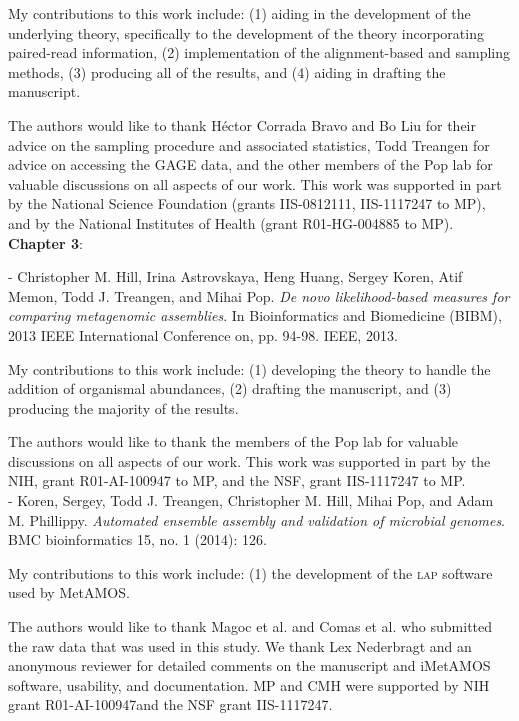 \documentclass[12pt,\mydriver]{thesis}
\begin{document}
My contributions to this work include: (1) aiding in the development of the underlying theory, specifically to the development of the theory incorporating paired-read information, (2) implementation of the alignment-based and sampling methods, (3) producing all of the results, and (4) aiding in drafting the manuscript.

The authors would like to thank H\'{e}ctor Corrada Bravo and Bo Liu for their advice on the sampling procedure and associated statistics, Todd Treangen for advice on accessing the GAGE data, and the other members of the Pop lab for valuable discussions on all aspects of our work. This work was supported in part by the National Science Foundation
(grants IIS-0812111, IIS-1117247 to MP), and by the National
Institutes of Health (grant R01-HG-004885 to MP).\\

\noindent\textbf{Chapter 3}:

\noindent - Christopher M. Hill, Irina Astrovskaya, Heng Huang, Sergey Koren, Atif Memon, Todd J. Treangen, and Mihai Pop. \textit{De novo likelihood-based measures for comparing metagenomic assemblies}. In Bioinformatics and Biomedicine (BIBM), 2013 IEEE International Conference on, pp. 94-98. IEEE, 2013.

My contributions to this work include: (1) developing the theory to handle the addition of organismal abundances, (2) drafting the manuscript, and (3) producing the majority of the results.

The authors would like to thank the members of the Pop lab for valuable discussions on all aspects of our work. This work was supported in part by the NIH, grant R01-AI-100947 to MP, and the NSF, grant IIS-1117247 to MP. \\

\noindent - Koren, Sergey, Todd J. Treangen, Christopher M. Hill, Mihai Pop, and Adam M. Phillippy. \textit{Automated ensemble assembly and validation of microbial genomes}. BMC bioinformatics 15, no. 1 (2014): 126.

My contributions to this work include: (1) the development of the \textsc{lap} software used by MetAMOS.

The authors would like to thank Magoc et al. and Comas et al. who submitted the raw data that was used in this study. We thank Lex Nederbragt and an anonymous reviewer for detailed comments on the manuscript and iMetAMOS software, usability, and documentation.  MP and CMH were supported by NIH grant R01-AI-100947and the NSF grant IIS-1117247. \\
\end{document}
